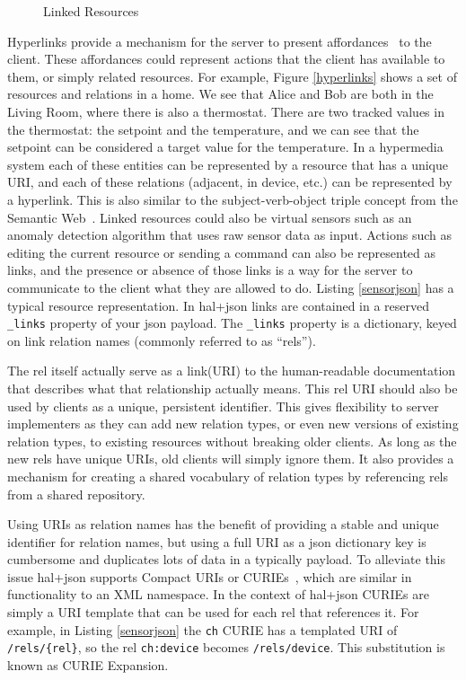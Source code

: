 \documentclass{acm_proc_article-sp}
\begin{document}
\begin{figure}
    \centering
    
    \caption{Linked Resources}
    \label{hyperlinks_distributed}
\end{figure}

Hyperlinks provide a mechanism for the server to present
affordances~\cite{gibson} to the client. These affordances could represent
actions that the client has available to them, or simply related resources. For
example, Figure \ref{hyperlinks} shows a set of resources and relations in a
home. We see that Alice and Bob are both in the Living Room, where there is
also a thermostat. There are two tracked values in the thermostat: the setpoint
and the temperature, and we can see that the setpoint can be considered a
target value for the temperature. In a hypermedia system each of these entities
can be represented by a resource that has a unique URI, and each of these
relations (adjacent, in device, etc.) can be represented by a hyperlink. This
is also similar to the subject-verb-object triple concept from the Semantic
Web~\cite{bernerslee2001semantic}. Linked resources could also be virtual
sensors such as an anomaly detection algorithm that uses raw sensor data as
input. Actions such as editing the current resource or sending a command can
also be represented as links, and the presence or absence of those links is a
way for the server to communicate to the client what they are allowed to do.
Listing \ref{sensorjson} has a typical resource representation.  In hal+json
links are contained in a reserved \texttt{\_links} property of your json
payload. The \texttt{\_links} property is a dictionary, keyed on link relation
names (commonly referred to as ``rels'').

The rel itself actually serve as a link(URI) to the human-readable
documentation that describes what that relationship actually means. This rel
URI should also be used by clients as a unique, persistent identifier. This
gives flexibility to server implementers as they can add new relation types, or
even new versions of existing relation types, to existing resources without
breaking older clients. As long as the new rels have unique URIs, old clients
will simply ignore them. It also provides a mechanism for creating a shared
vocabulary of relation types by referencing rels from a shared repository.

Using URIs as relation names has the benefit of providing a stable and unique
identifier for relation names, but using a full URI as a json dictionary key is
cumbersome and duplicates lots of data in a typically payload. To alleviate this
issue hal+json supports Compact URIs or CURIEs~\cite{curies}, which are similar in
functionality to an XML namespace. In the context of hal+json CURIEs are simply
a URI template that can be used for each rel that references it. For example,
in Listing \ref{sensorjson} the \texttt{ch} CURIE has a templated URI of
\texttt{/rels/\{rel\}}, so the rel \texttt{ch:device} becomes
\texttt{/rels/device}. This substitution is known as CURIE Expansion.
\end{document}
